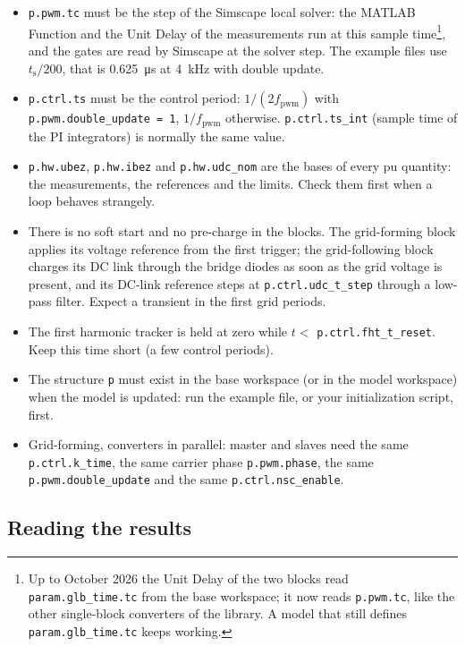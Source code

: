 \documentclass[11pt,a4paper]{scrartcl}
\newcommand{\ped}[1]{_{\mathrm{#1}}}
\newcommand{\code}[1]{\texttt{#1}}
\begin{document}
\begin{onehalfspace}
\begin{mybox}
\begin{itemize}[nosep]
	\item \code{p.pwm.tc} must be the step of the Simscape local solver: the MATLAB Function and the Unit Delay of the measurements run at this sample time\footnote{Up to October 2026 the Unit Delay of the two blocks read \code{param.glb\_time.tc} from the base workspace; it now reads \code{p.pwm.tc}, like the other single-block converters of the library. A model that still defines \code{param.glb\_time.tc} keeps working.}, and the gates are read by Simscape at the solver step. The example files use $t\ped{s}/200$, that is \SI{0.625}{\micro\second} at \SI{4}{\kilo\hertz} with double update.
	\item \code{p.ctrl.ts} must be the control period: $1/(2 f\ped{pwm})$ with \code{p.pwm.double\_update = 1}, $1/f\ped{pwm}$ otherwise. \code{p.ctrl.ts\_int} (sample time of the PI integrators) is normally the same value.
	\item \code{p.hw.ubez}, \code{p.hw.ibez} and \code{p.hw.udc\_nom} are the bases of every pu quantity: the measurements, the references and the limits. Check them first when a loop behaves strangely.
	\item There is no soft start and no pre-charge in the blocks. The grid-forming block applies its voltage reference from the first trigger; the grid-following block charges its DC link through the bridge diodes as soon as the grid voltage is present, and its DC-link reference steps at \code{p.ctrl.udc\_t\_step} through a low-pass filter. Expect a transient in the first grid periods.
	\item The first harmonic tracker is held at zero while $t <$ \code{p.ctrl.fht\_t\_reset}. Keep this time short (a few control periods).
	\item The structure \code{p} must exist in the base workspace (or in the model workspace) when the model is updated: run the example file, or your initialization script, first.
	\item Grid-forming, converters in parallel: master and slaves need the same \code{p.ctrl.k\_time}, the same carrier phase \code{p.pwm.phase}, the same \code{p.pwm.double\_update} and the same \code{p.ctrl.nsc\_enable}.
\end{itemize}
\end{mybox}

\subsection{Reading the results}
\label{sec:results}


\end{onehalfspace}
\end{document}

